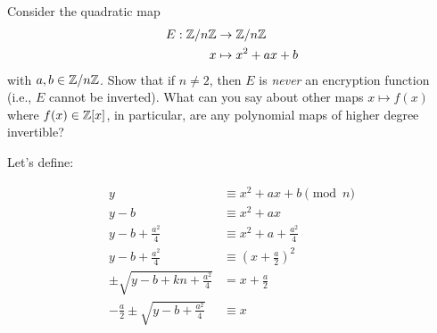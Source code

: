 
\begin{problem}
Consider the quadratic map
\begin{align*}
E:\mathbb{Z}/n\mathbb{Z} &\to \mathbb{Z}/n\mathbb{Z} \\
x &\mapsto x^2+ax+b
\end{align*}
with $a,b \in \mathbb{Z}/n\mathbb{Z}$.  Show that if $n \neq 2$, then $E$ is
\emph{never} an encryption function (i.e., $E$ cannot be inverted).
What can you say about other maps $x \mapsto f(x)$ where $f(x) \in
\mathbb{Z}[x]$, in particular, are any polynomial maps of higher degree invertible?
\end{problem}
\begin{Answer}

Let's define: 

\begin{align*}
  y &\equiv x^2+ax+b \pmod n\\
  y - b &\equiv  x^2+ax\\
  y - b + \frac{a^2}{4} &\equiv x^2+a + \frac{a^2}{4}\\
  y - b + \frac{a^2}{4} &\equiv (x + \frac{a}{2})^2\\
  \pm \sqrt{y - b + kn + \frac{a^2}{4}} &= x + \frac{a}{2}\\
  -\frac{a}{2} \pm \sqrt{y - b + \frac{a^2}{4}} &\equiv x\\
\end{align*}

\end{Answer}
